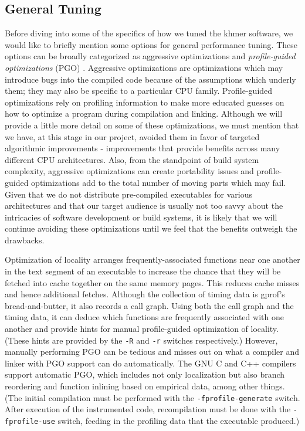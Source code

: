 \documentclass{article}
\begin{document}
\subsection{General Tuning}


Before diving into some of the specifics of how we tuned the khmer software, we
would like to briefly mention some options for general performance tuning.
These options can be broadly categorized as aggressive optimizations and
\textit{profile-guided optimizations} (PGO) \citep{web:PGO}. Aggressive
optimizations are optimizations which may introduce bugs into the compiled code
because of the assumptions which underly them; they may also be specific to a
particular CPU family. Profile-guided optimizations rely on profiling
information to make more educated guesses on how to optimize a program during
compilation and linking. Although we will provide a little more detail on some
of these optimizations, we must mention that we have, at this stage in our
project, avoided them in favor of targeted algorithmic improvements -
improvements that provide benefits across many different CPU architectures.
Also, from the standpoint of build system complexity, aggressive optimizations
can create portability issues and profile-guided optimizations add to the total
number of moving parts which may fail. Given that we do not distribute
pre-compiled executables for various architectures and that our target audience
is usually not too savvy about the intricacies of software development or build
systems, it is likely that we will continue avoiding these optimizations until
we feel that the benefits outweigh the drawbacks.

Optimization of locality arranges frequently-associated functions near one
another in the text segment of an executable to increase the chance that they
will be fetched into cache together on the same memory pages. This reduces
cache misses and hence additional fetches. Although the collection of timing
data is gprof's bread-and-butter, it also records a call graph. Using both the
call graph and the timing data, it can deduce which functions are frequently
associated with one another and provide hints for manual profile-guided
optimization of locality. (These hints are provided by the \texttt{-R} and
\texttt{-r} switches respectively.) However, manually performing PGO can be
tedious and misses out on what a compiler and linker with PGO support can do
automatically. The GNU C and C++ compilers support automatic PGO, which
includes not only localization but also branch reordering and function inlining
based on empirical data, among other things. (The initial compilation must be
performed with the \texttt{-fprofile-generate} switch. After execution of the
instrumented code, recompilation must be done with the \texttt{-fprofile-use}
switch, feeding in the profiling data that the executable produced.)
\end{document}
